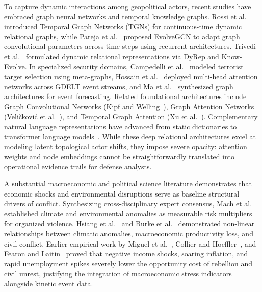 \documentclass[preprint,12pt]{elsarticle}
\begin{document}
To capture dynamic interactions among geopolitical actors, recent studies have embraced graph neural networks and temporal knowledge graphs. Rossi et al.~\cite{rossi2020temporal} introduced Temporal Graph Networks (TGNs) for continuous-time dynamic relational graphs, while Pareja et al.~\cite{pareja2020evolvegcn} proposed EvolveGCN to adapt graph convolutional parameters across time steps using recurrent architectures. Trivedi et al.~\cite{trivedi2019dyrep, trivedi2017know} formulated dynamic relational representations via DyRep and Know-Evolve. In specialized security domains, Campedelli et al.~\cite{campedelli2021learning} modeled terrorist target selection using meta-graphs, Hossain et al.~\cite{hossain2023identifying} deployed multi-head attention networks across GDELT event streams, and Ma et al.~\cite{ma2023event} synthesized graph architectures for event forecasting. Related foundational architectures include Graph Convolutional Networks (Kipf and Welling~\cite{kipf2017semi}), Graph Attention Networks (Veli\v{c}kovi\'{c} et al.~\cite{velickovic2018graph}), and Temporal Graph Attention (Xu et al.~\cite{xu2020inductive}). Complementary natural language representations have advanced from static dictionaries to transformer language models~\cite{devlin2019bert, liu2019roberta, sanh2019distilbert, banea2014multilingual, hutto2014vader, vaswani2017attention, radford2019language, reimers2019sentence}. While these deep relational architectures excel at modeling latent topological actor shifts, they impose severe opacity: attention weights and node embeddings cannot be straightforwardly translated into operational evidence trails for defense analysts.

A substantial macroeconomic and political science literature demonstrates that economic shocks and environmental disruptions serve as baseline structural drivers of conflict. Synthesizing cross-disciplinary expert consensus, Mach et al.~\cite{mach2019climate} established climate and environmental anomalies as measurable risk multipliers for organized violence. Hsiang et al.~\cite{hsiang2013quantifying} and Burke et al.~\cite{burke2015global} demonstrated non-linear relationships between climatic anomalies, macroeconomic productivity loss, and civil conflict. Earlier empirical work by Miguel et al.~\cite{miguel2004economic}, Collier and Hoeffler~\cite{collier2004greed}, and Fearon and Laitin~\cite{fearon2003ethnicity} proved that negative income shocks, soaring inflation, and rapid unemployment spikes severely lower the opportunity cost of rebellion and civil unrest, justifying the integration of macroeconomic stress indicators alongside kinetic event data.
\end{document}
